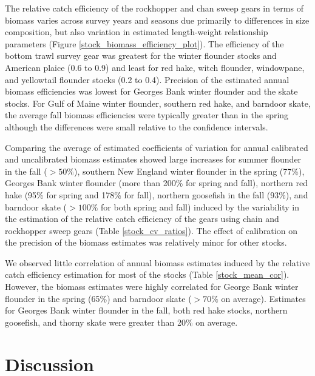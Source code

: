 \documentclass[
  12pt,
]{article}
\begin{document}
The relative catch efficiency of the rockhopper and chan sweep gears in
terms of biomass varies across survey years and seasons due primarily to
differences in size composition, but also variation in estimated
length-weight relationship parameters (Figure
\ref{stock_biomass_efficiency_plot}). The efficiency of the bottom trawl
survey gear was greatest for the winter flounder stocks and American
plaice (0.6 to 0.9) and least for red hake, witch flounder, windowpane,
and yellowtail flounder stocks (0.2 to 0.4). Precision of the estimated
annual biomass efficiencies was lowest for Georges Bank winter flounder
and the skate stocks. For Gulf of Maine winter flounder, southern red
hake, and barndoor skate, the average fall biomass efficiencies were
typically greater than in the spring although the differences were small
relative to the confidence intervals.

Comparing the average of estimated coefficients of variation for annual
calibrated and uncalibrated biomass estimates showed large increases for
summer flounder in the fall (\(> 50\%\)), southern New England winter
flounder in the spring (77\%), Georges Bank winter flounder (more than
200\% for spring and fall), northern red hake (95\% for spring and 178\%
for fall), northern goosefish in the fall (93\%), and barndoor skate
(\(>100\%\) for both spring and fall) induced by the variability in the
estimation of the relative catch efficiency of the gears using chain and
rockhopper sweep gears (Table \ref{stock_cv_ratios}). The effect of
calibration on the precision of the biomass estimates was relatively
minor for other stocks.

We observed little correlation of annual biomass estimates induced by
the relative catch efficiency estimation for most of the stocks (Table
\ref{stock_mean_cor}). However, the biomass estimates were highly
correlated for George Bank winter flounder in the spring (65\%) and
barndoor skate (\(>70\%\) on average). Estimates for Georges Bank winter
flounder in the fall, both red hake stocks, northern goosefish, and
thorny skate were greater than 20\% on average.

\hypertarget{discussion}{%
\section{Discussion}\label{discussion}}
\end{document}

